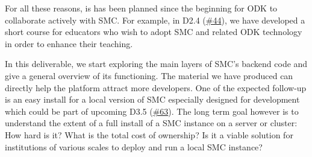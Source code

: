 For all these reasons, is has been planned since the beginning for ODK
to collaborate actively with SMC. For example, in D2.4
(\href{https://github.com/OpenDreamKit/OpenDreamKit/issues/44}{\#44}),
we have developed a short course for educators who wish to adopt SMC and
related ODK technology in order to enhance their teaching.

In this deliverable, we start exploring the main layers of SMC's backend
code and give a general overview of its functioning. The material we
have produced can directly help the platform attract more developers.
One of the expected follow-up is an easy install for a local version of
SMC especially designed for development which could be part of upcoming
D3.5
(\href{https://github.com/OpenDreamKit/OpenDreamKit/issues/63}{\#63}).
The long term goal however is to understand the extent of a full install
of a SMC instance on a server or cluster: How hard is it? What is the
total cost of ownership? Is it a viable solution for institutions of
various scales to deploy and run a local SMC instance?
